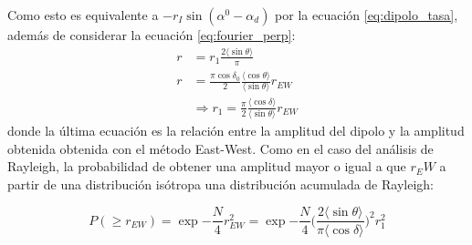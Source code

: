 
Como esto es equivalente a $-r_I\sin(\alpha^0  - \alpha_d)$ por la ecuación \ref{eq:dipolo_tasa}, además de considerar la ecuación \ref{eq:fourier_perp}:
\begin{align}
    r  &= r_1 \frac{2\langle\sin\theta \rangle }{\pi}\\
    r &= \frac{\pi \cos\delta_0}{2} \frac{\langle\cos\theta \rangle}{\langle\sin\theta \rangle} r_{EW} \\
    &\Rightarrow  r_1 = \frac{\pi}{2} \frac{\langle\cos\delta \rangle}{\langle\sin\theta \rangle} r_{EW}
\end{align}
donde la última ecuación es la relación entre la amplitud del dipolo y la amplitud obtenida obtenida con el método East-West. Como en el caso del análisis de Rayleigh, la probabilidad de obtener una amplitud mayor o igual a que $r_EW$ a partir de una distribución isótropa una distribución acumulada de Rayleigh:

\begin{equation}
    P(\geq r_{EW}) = \exp{-\frac{N}{4}r^2_{EW}} = \exp{-\frac{N}{4} \Big ( \frac{2 \langle\sin\theta \rangle }{\pi \langle\cos\delta \rangle} \Big)^2 r^2_{1} }
\end{equation}

